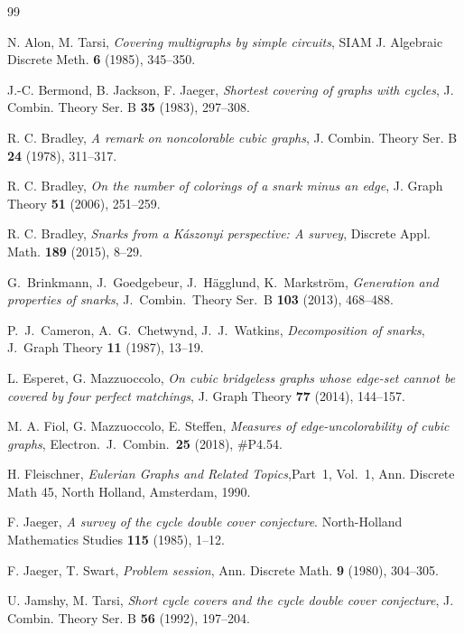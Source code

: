 \documentclass[a4paper]{amsart}
\theoremstyle{plain}
\theoremstyle{definition}
\begin{document}
\bigskip

\begin{thebibliography}{99}
\frenchspacing

 N. Alon, M. Tarsi, \emph{Covering multigraphs
    by simple circuits}, SIAM J. Algebraic Discrete Meth.
    \textbf{6} (1985), 345--350.

 J.-C. Bermond, B. Jackson, F. Jaeger,
    \emph{Shortest covering of graphs with cycles}, J. Combin.
    Theory Ser. B \textbf{35} (1983), 297--308.

 R. C. Bradley, \emph{A remark on noncolorable
    cubic graphs}, J. Combin. Theory Ser. B \textbf{24} (1978),
    311--317.

 R. C. Bradley, \emph{On the number of colorings
    of a snark minus an edge}, J. Graph Theory \textbf{51}
    (2006), 251--259.

 R. C. Bradley, \emph{Snarks from a K\'aszonyi
    perspective: A survey}, Discrete Appl. Math. \textbf{189}
    (2015), 8--29.

 G.~Brinkmann, J.~Goedgebeur, J.~H\"agglund,
    K.~Markstr\"om, \emph{Generation and properties of snarks},
    J.~Combin.~Theory Ser.~B \textbf{103} (2013), 468--488.

 P.~J.~Cameron, A.~G.~Chetwynd, J.~J.~Watkins,
    \emph{Decomposition of snarks}, J.~Graph Theory
    \textbf{11} (1987), 13--19.

 L. Esperet, G. Mazzuoccolo, \emph{On cubic
    bridgeless graphs whose edge-set cannot be covered by four
    perfect matchings}, J. Graph Theory \textbf{77} (2014),
    144--157.

 M. A. Fiol, G. Mazzuoccolo, E. Steffen,
	\emph{Measures of edge-uncolorability of cubic graphs},
	Electron.~J.~Combin.~\textbf{25} (2018), $\#$P4.54.
	
 H. Fleischner, \emph{Eulerian Graphs and Related
    Topics},Part~1, Vol.~1, Ann. Discrete Math 45, North
    Holland, Amsterdam, 1990.

 F. Jaeger,  \emph{A survey of the cycle
    double cover conjecture}. North-Holland Mathematics
    Studies \textbf{115} (1985), 1--12.

 F. Jaeger, T. Swart,  \emph{Problem session},
    Ann. Discrete Math. \textbf{9} (1980), 304--305. 	

 U. Jamshy, M. Tarsi, \emph{Short cycle covers and
    the cycle double cover conjecture}, J. Combin. Theory Ser.
    B \textbf{56} (1992), 197--204.


\end{thebibliography}
\end{document}
